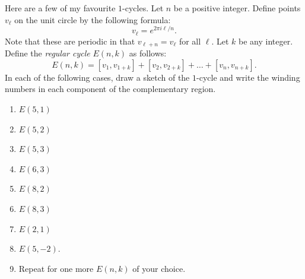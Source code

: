 \documentclass[12 pt, letterpaper]{hmcpset}
\begin{document}
\begin{problem}[3.]
	Here are a few of my favourite $1$-cycles. Let $n$ be a positive integer. Define points $v_{\ell}$ on the unit circle by the following formula:
	\[
		v_{\ell} = e^{2 \pi i \ell / n}.
	\]
	Note that these are periodic in that $v_{\ell + n} = v_{\ell}$ for all $\ell$. Let $k$ be any integer. Define the \emph{regular cycle} $E(n, k)$ as follows:
	\[
		E(n, k) = [v_{1}, v_{1 + k}] + [v_{2}, v_{2 + k}] + \dots + [v_{n}, v_{n + k}].
	\]
	In each of the following cases, draw a sketch of the $1$-cycle and write the winding numbers in each component of the complementary region.
	\begin{enumerate}
		\item $E(5, 1)$ 
		\item $E(5, 2)$ 
		\item $E(5, 3)$
		\item $E(6, 3)$ 
		\item $E(8, 2)$ 
		\item $E(8, 3)$ 
		\item $E(2, 1)$
		\item $E(5, -2)$.
		\item Repeat for one more $E(n, k)$ of your choice.
	\end{enumerate}
\end{problem}
\end{document}
